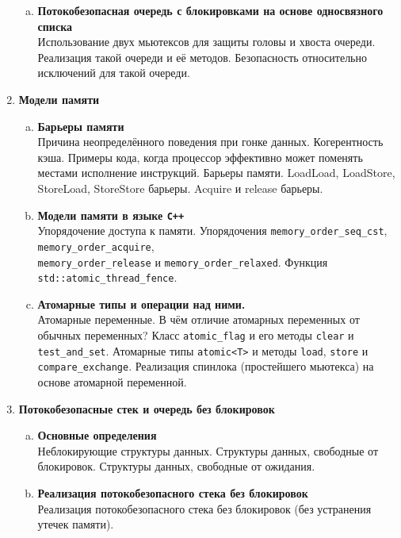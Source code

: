 \documentclass{article}
\begin{document}
\begin{enumerate}
\begin{enumerate}[a.]
\item \textbf{Потокобезопасная очередь с блокировками на основе односвязного списка}\\
Использование двух мьютексов для защиты головы и хвоста очереди. Реализация такой очереди и её методов. Безопасность относительно исключений для такой очереди.
\end{enumerate}



\item \textbf{Модели памяти}
\begin{enumerate}[a.]
\item \textbf{Барьеры памяти}\\
Причина неопределённого поведения при гонке данных. Когерентность кэша. Примеры кода, когда процессор эффективно может поменять местами исполнение инструкций. Барьеры памяти. LoadLoad, LoadStore, StoreLoad, StoreStore барьеры. Acquire и release барьеры. 

\item \textbf{Модели памяти в языке \texttt{C++}}\\
Упорядочение доступа к памяти. Упорядочения \texttt{memory\_order\_seq\_cst}, \texttt{memory\_order\_acquire}, \\ \texttt{memory\_order\_release} и \texttt{memory\_order\_relaxed}. Функция \texttt{std::atomic\_thread\_fence}.


\item \textbf{Атомарные типы и операции над ними.}\\
Атомарные переменные. В чём отличие атомарных переменных от обычных переменных? Класс \texttt{atomic\_flag} и его методы \texttt{clear} и \texttt{test\_and\_set}. Атомарные типы \texttt{atomic<T>} и методы \texttt{load}, \texttt{store} и \texttt{compare\_exchange}.  Реализация спинлока (простейшего мьютекса) на основе атомарной переменной.

\end{enumerate}



\item \textbf{Потокобезопасные стек и очередь без блокировок}
\begin{enumerate}[a.]
\item \textbf{Основные определения}\\
Неблокирующие структуры данных. Структуры данных, свободные от блокировок. Структуры данных, свободные от ожидания.

\item \textbf{Реализация потокобезопасного стека без блокировок}\\
Реализация потокобезопасного стека без блокировок (без устранения утечек памяти).


\end{enumerate}
\end{enumerate}
\end{document}
